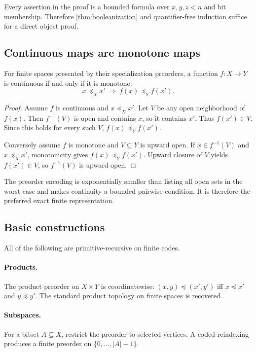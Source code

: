 Every assertion in the proof is a bounded formula over $x,y,z<n$ and bit membership.  Therefore \cref{thm:booleanization} and quantifier-free induction suffice for a direct object proof.

\subsection{Continuous maps are monotone maps}

\begin{theorem}
\label{thm:finite-continuity}
For finite spaces presented by their specialization preorders, a function $f:X\to Y$ is continuous if and only if it is monotone:
\[
  x\preceq_X x'\ \Longrightarrow\ f(x)\preceq_Y f(x').
\]
\end{theorem}

\begin{proof}
Assume $f$ is continuous and $x\preceq_X x'$.  Let $V$ be any open neighborhood of $f(x)$.  Then $f^{-1}(V)$ is open and contains $x$, so it contains $x'$.  Thus $f(x')\in V$.  Since this holds for every such $V$, $f(x)\preceq_Y f(x')$.

Conversely assume $f$ is monotone and $V\subseteq Y$ is upward open.  If $x\in f^{-1}(V)$ and $x\preceq_X x'$, monotonicity gives $f(x)\preceq_Y f(x')$.  Upward closure of $V$ yields $f(x')\in V$, so $f^{-1}(V)$ is upward open.
\end{proof}

The preorder encoding is exponentially smaller than listing all open sets in the worst case and makes continuity a bounded pairwise condition.  It is therefore the preferred exact finite representation.

\subsection{Basic constructions}

All of the following are primitive-recursive on finite codes.

\paragraph{Products.}
The product preorder on $X\times Y$ is coordinatewise:
$(x,y)\preceq(x',y')$ iff $x\preceq x'$ and $y\preceq y'$.  The standard product topology on finite spaces is recovered.

\paragraph{Subspaces.}
For a bitset $A\subseteq X$, restrict the preorder to selected vertices.  A coded reindexing produces a finite preorder on $\{0,\ldots,|A|-1\}$.

